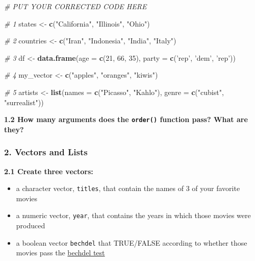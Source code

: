 \documentclass[]{book}
\newenvironment{Shaded}{\begin{snugshade}}{\end{snugshade}}
\newcommand{\KeywordTok}[1]{\textcolor[rgb]{0.13,0.29,0.53}{\textbf{#1}}}
\newcommand{\DataTypeTok}[1]{\textcolor[rgb]{0.13,0.29,0.53}{#1}}
\newcommand{\DecValTok}[1]{\textcolor[rgb]{0.00,0.00,0.81}{#1}}
\newcommand{\StringTok}[1]{\textcolor[rgb]{0.31,0.60,0.02}{#1}}
\newcommand{\CommentTok}[1]{\textcolor[rgb]{0.56,0.35,0.01}{\textit{#1}}}
\newcommand{\NormalTok}[1]{#1}
\begin{document}
\begin{Shaded}
\begin{Highlighting}[]
\CommentTok{# PUT YOUR CORRECTED CODE HERE}

\CommentTok{# 1}
\NormalTok{states <-}\StringTok{ }\KeywordTok{c}\NormalTok{(}\StringTok{"California"}\NormalTok{, }\StringTok{"Illinois"}\NormalTok{, }\StringTok{"Ohio"}\NormalTok{)}

\CommentTok{# 2}
\NormalTok{countries <-}\StringTok{ }\KeywordTok{c}\NormalTok{(}\StringTok{"Iran"}\NormalTok{, }\StringTok{"Indonesia"}\NormalTok{, }\StringTok{"India"}\NormalTok{, }\StringTok{"Italy"}\NormalTok{)}

\CommentTok{# 3}
\NormalTok{df <-}\StringTok{ }\KeywordTok{data.frame}\NormalTok{(}\DataTypeTok{age =} \KeywordTok{c}\NormalTok{(}\DecValTok{21}\NormalTok{, }\DecValTok{66}\NormalTok{, }\DecValTok{35}\NormalTok{),}
                 \DataTypeTok{party =} \KeywordTok{c}\NormalTok{(}\StringTok{'rep'}\NormalTok{, }\StringTok{'dem'}\NormalTok{, }\StringTok{'rep'}\NormalTok{))}

\CommentTok{# 4}
\NormalTok{my_vector <-}\StringTok{ }\KeywordTok{c}\NormalTok{(}\StringTok{"apples"}\NormalTok{, }\StringTok{"oranges"}\NormalTok{, }\StringTok{"kiwis"}\NormalTok{)}

\CommentTok{# 5}
\NormalTok{artists <-}\StringTok{ }\KeywordTok{list}\NormalTok{(}\DataTypeTok{names =} \KeywordTok{c}\NormalTok{(}\StringTok{"Picasso"}\NormalTok{, }\StringTok{"Kahlo"}\NormalTok{),}
                \DataTypeTok{genre =} \KeywordTok{c}\NormalTok{(}\StringTok{"cubist"}\NormalTok{, }\StringTok{"surrealist"}\NormalTok{))}
\end{Highlighting}
\end{Shaded}

\textbf{1.2 How many arguments does the \texttt{order()} function pass?
What are they?}

\subsubsection*{2. Vectors and Lists}\label{vectors-and-lists}

\textbf{2.1 Create three vectors:}

\begin{itemize}
\item
  a character vector, \texttt{titles}, that contain the names of 3 of
  your favorite movies
\item
  a numeric vector, \texttt{year}, that contains the years in which
  those movies were produced
\item
  a boolean vector \texttt{bechdel} that TRUE/FALSE according to whether
  those movies pass the \href{http://bechdeltest.com/}{bechdel test}
\end{itemize}
\end{document}
